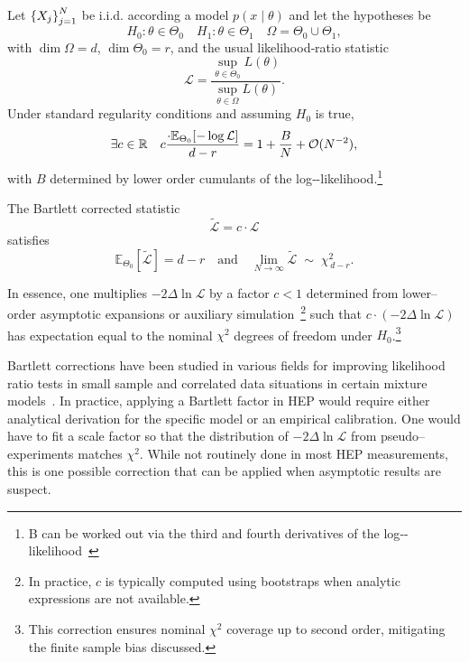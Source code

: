\begin{theorem}
\noproofref
    Let \(\qty{X_j}_{j=1}^N\) be i.i.d. according a model \(p(x\mid\theta)\) and let the hypotheses be
    \[
        H_{0}:\theta\in\Theta_{0} \quad H_{1}:\theta\in\Theta_{1}\quad \Omega = \Theta_0\cup\Theta_1,
    \]
    with \(\dim\Omega=d\), \(\dim\Theta_{0}=r\), and the usual likelihood‐ratio statistic
    \[
        \mathcal L = \frac{\sup_{\theta\in\Theta_{0}}L(\theta)}{\sup_{\theta\in\Omega}L(\theta)}.
    \]
    Under standard regularity conditions and assuming \(H_{0}\) is true,
    \[
        \exists c\in\mathbb{R}\quad c\frac{\cdot\mathbb{E}_{\Theta_{0}}[-\log\mathcal L]}{d-r} = 1 + \frac{B}{N} + \mathcal{O}(N^{-2}),
    \]
    with \(B\) determined by lower order cumulants of the log‐-likelihood.\footnote{B can be worked out via the third and fourth derivatives of the log‐-likelihood~\cite{lawley_tests_1956}}
\end{theorem}
\begin{theorem}
\noproofref
    The Bartlett corrected statistic
    \[
        \widetilde{\mathcal L} = c\cdot \mathcal L
    \]
    satisfies
    \[
        \mathbb{E}_{\Theta_{0}}[\widetilde{\mathcal L}] = d-r
        \quad\text{and}\quad
        \lim_{N\to\infty}\widetilde{\mathcal L}\;\sim\;\chi^{2}_{\,d-r}.
    \]
\end{theorem}

            In essence, one multiplies $-2\Delta\ln\mathcal{L}$ by a factor $c < 1$ determined from lower--order asymptotic expansions or auxiliary simulation~\cite{Chen2020AVariables, battey_non-standard_2024}\footnote{In practice, \(c\) is typically computed using bootstraps when analytic expressions are not available.} such that $c \cdot (-2\Delta\ln\mathcal{L})$ has expectation equal to the nominal $\chi^2$ degrees of freedom under $H_0$.\footnote{This correction ensures nominal \(\chi^2\) coverage up to second order, mitigating the finite sample bias discussed.}
            
            Bartlett corrections have been studied in various fields for improving likelihood ratio tests in small sample and correlated data situations in certain mixture models~\cite{hu_mixture_2022}.
            In practice, applying a Bartlett factor in HEP would require either analytical derivation for the specific model or an empirical calibration.
            One would have to fit a scale factor so that the distribution of $-2\Delta\ln\mathcal{L}$ from pseudo--experiments matches $\chi^2$.
            While not routinely done in most HEP measurements, this is one possible  correction that can be applied when asymptotic results are suspect.

